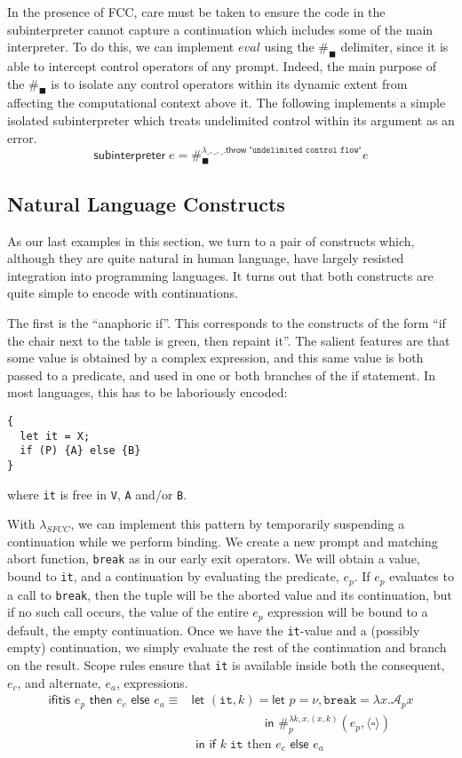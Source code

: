 \documentclass[11pt]{article}
\newcommand{\maybePage}{\newpage}
\newcommand\x{\lambda x}
\newcommand{\letin}[2]{\textsf{let }#1\textsf{ in }#2}
\newcommand\A{\mathcal{A}}
\newcommand{\angles}[1]{\langle#1\rangle}
\begin{document}
In the presence of FCC, care must be taken to ensure the code in the subinterpreter cannot capture a continuation which includes some of the main interpreter.
To do this, we can implement $eval$ using the $\#_\blacksquare$ delimiter, since it is able to intercept control operators of any prompt.
Indeed, the main purpose of the $\#_\blacksquare$ is to isolate any control operators within its dynamic extent from affecting the computational context above it.
The following implements a simple isolated subinterpreter which treats undelimited control within its argument as an error.
$$\textsf{subinterpreter}\;e = \#_\blacksquare^{\lambda\_,\_,\_.\textsf{throw}\;\texttt{"undelimited control flow"}}e$$



\maybePage
\subsection{Natural Language Constructs}

As our last examples in this section, we turn to a pair of constructs which, although they are quite natural in human language, have largely resisted integration into programming languages.
It turns out that both constructs are quite simple to encode with continuations.

The first is the ``anaphoric if''.
This corresponds to the constructs of the form ``if the chair next to the table is green, then repaint it''.
The salient features are that some value is obtained by a complex expression, and this same value is both passed to a predicate, and used in one or both branches of the if statement.
In most languages, this has to be laboriously encoded:
\begin{verbatim}
{
  let it = X;
  if (P) {A} else {B}
}
\end{verbatim}
where \texttt{it} is free in \texttt{V}, \texttt{A} and/or \texttt{B}.

With $\lambda_{SFCC}$, we can implement this pattern by temporarily suspending a continuation while we perform binding.
We create a new prompt and matching abort function, \texttt{break} as in our early exit operators.
We will obtain a value, bound to \texttt{it}, and a continuation by evaluating the predicate, $e_p$.
If $e_p$ evaluates to a call to \texttt{break}, then the tuple will be the aborted value and its continuation, but if no such call occurs, the value of the entire $e_p$ expression will be bound to a default, the empty continuation.
Once we have the \texttt{it}-value and a (possibly empty) continuation, we simply evaluate the rest of the continuation and branch on the result.
Scope rules ensure that \texttt{it} is available inside both the consequent, $e_c$, and alternate, $e_a$, expressions.
\begin{align*}
\textsf{ifitis }e_p\textsf{ then }e_c\textsf{ else }e_a \equiv{}
	&\letin{(\texttt{it}, k) = \letin{p = \nu, \texttt{break} = \x.\A_px
	\\&\qquad\qquad\quad\;\;}{\#_p^{\lambda k,x.(x,k)}(e_p, \angles{\square})}
	\\&}{\textsf{if }k\;\texttt{it}\text{ then }e_c\textsf{ else }e_a}
\end{align*}
\end{document}
